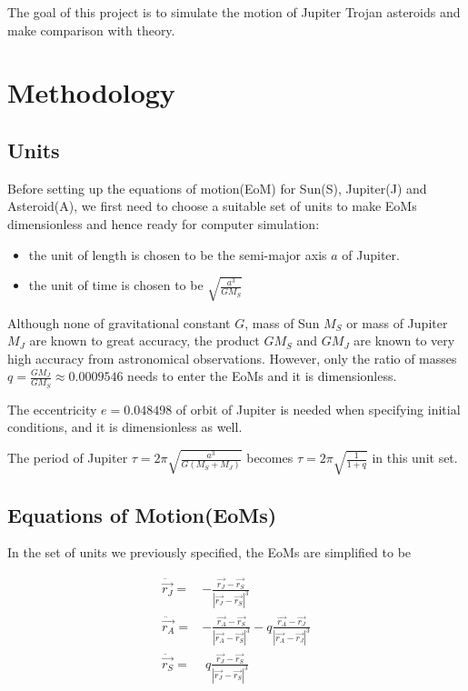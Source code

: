 \documentclass[12pt,a4paper]{article}
\begin{document}
The goal of this project is to simulate the motion of Jupiter Trojan asteroids and make comparison with theory.


\section{Methodology}

\subsection{Units}

Before setting up the equations of motion(EoM) for Sun(S), Jupiter(J) and Asteroid(A), we first need to choose a suitable set of units to make EoMs dimensionless and hence ready for computer simulation:

\begin{itemize}
	\item the unit of length is chosen to be the semi-major axis $a$ of Jupiter.
	\item the unit of time is chosen to be $\displaystyle{\sqrt{\frac{a^3}{GM_S}}}$
\end{itemize}
	
Although none of gravitational constant $G$, mass of Sun $M_S$ or mass of Jupiter $M_J$ are known to great accuracy, the product $GM_S$ and $GM_J$ are known to very high accuracy from astronomical observations. However, only the ratio of masses $\displaystyle{q = \frac{GM_J}{GM_S} \approx 0.0009546}$ needs to enter the EoMs and it is dimensionless.

The eccentricity $e= 0.048498$ of orbit of Jupiter is needed when specifying initial conditions, and it is dimensionless as well.

The period of Jupiter $\displaystyle{\tau = 2\pi \sqrt{\frac{a^3}{G(M_S+M_J)}}}$ becomes $\displaystyle{\tau = 2\pi \sqrt{\frac{1}{1+q}}}$ in this unit set.

\subsection{Equations of Motion(EoMs)}
 
In the set of units we previously specified, the EoMs are simplified to be

\begin{align}
	\ddot{\vec{r_J}} =& - \frac{\vec{r_J}-\vec{r_S}} {{|\vec{r_J}-\vec{r_S}|}^3} \\
	\ddot{\vec{r_A}} =& - \frac{\vec{r_A}-\vec{r_S}} {{|\vec{r_A}-\vec{r_S}|}^3} - q \frac{\vec{r_A}-\vec{r_J}} {{|\vec{r_A}-\vec{r_J}|}^3} \\	
	\ddot{\vec{r_S}} =& \;  q \frac{\vec{r_J}-\vec{r_S}} {{|\vec{r_J}-\vec{r_S}|}^3}
\end{align}
\end{document}
